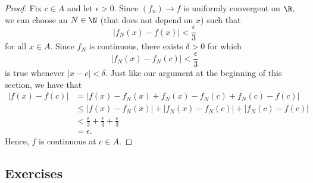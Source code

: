 \begin{proof}
Fix \( c \in A  \) and let \( \epsilon > 0  \). Since \( (f_n) \to f   \) is uniformly convergent on \( \R  \), we can choose an \( N \in \N   \) (that does not depend on \( x  \)) such that 
\[  | f_N(x) - f(x)  | < \frac{ \epsilon  }{ 3  }  \]
for all \( x \in A  \). Since \( f_N  \) is continuous, there exists \( \delta > 0  \) for which 
\[  | f_N(x) - f_N(c)  | < \frac{ \epsilon  }{ 3 }  \]
is true whenever \( | x - c  | < \delta  \). Just like our argument at the beginning of this section, we have that
\begin{align*}
    | f(x) - f(c)  | &= | f(x) - f_N(x) + f_N(x) - f_N(c) + f_N(c) - f(c)  |  \\
                     &\leq | f(x) - f_N(x)  | + | f_N(x) - f_N(c)  | + | f_N(c) - f(c)  | \\
                     &< \frac{ \epsilon  }{ 3  } + \frac{ \epsilon  }{ 3 } + \frac{ \epsilon  }{ 3  } \\
                     &= \epsilon.
\end{align*}
Hence, \( f  \) is continuous at \( c \in  A  \).
\end{proof}


\subsection{Exercises}















